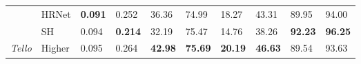 \begin{table}[hbt!]
{\begin{tabular}{c|l|llllllll}
\multicolumn{1}{l|}{} & HRNet & {\color[HTML]{00D2CB} \textbf{0.091}} & 0.252 & 36.36 & 74.99 & 18.27 & 43.31 & 89.95 & 94.00 \\
\multicolumn{1}{l|}{} & SH & 0.094 & {\color[HTML]{00D2CB} \textbf{0.214}} & 32.19 & 75.47 & 14.76 & 38.26 & {\color[HTML]{00D2CB} \textbf{92.23}} & {\color[HTML]{00D2CB} \textbf{96.25}} \\
\multicolumn{1}{l|}{\multirow{-6}{*}{\textit{Tello}}} & Higher & 0.095 & 0.264 & {\color[HTML]{00D2CB} \textbf{42.98}} & {\color[HTML]{00D2CB} \textbf{75.69}} & {\color[HTML]{00D2CB} \textbf{20.19}} & {\color[HTML]{00D2CB} \textbf{46.63}} & 89.54 & 93.63 \\ \hline
\end{tabular}}
\end{table}